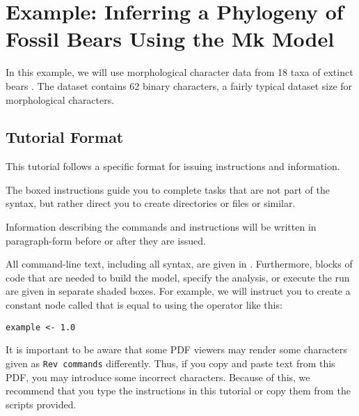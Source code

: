 \section{Example: Inferring a Phylogeny of Fossil Bears Using the Mk Model}\label{sec:dm_simple}

In this example, we will use morphological character data from 18 taxa of extinct bears \citep{abella2011}. 
The dataset contains 62 binary characters, a fairly typical dataset size for morphological characters. \par

\medskip
\subsection{Tutorial Format}\label{subsect:Exercise-Format}

This tutorial follows a specific format for issuing instructions and information.

{\begin{framed}
The boxed instructions guide you to complete tasks that are not part of the \RevBayes syntax, but rather direct you to create directories or files or similar.
\end{framed}}


Information describing the commands and instructions will be written in paragraph-form before or after they are issued.

All command-line text, including all \Rev syntax, are given in . 
Furthermore, blocks of \Rev code that are needed to build the model, specify the analysis, or execute the run are given in separate shaded boxes.
For example, we will instruct you to create a constant node called  that is equal to  using the \cl{<-} operator like this:
{\tt \begin{snugshade*}
\begin{lstlisting}
example <- 1.0
\end{lstlisting}
\end{snugshade*}
}

It is important to be aware that some PDF viewers may render some characters given as \colorbox{shadecolor}{\tt{Rev commands}} differently. 
Thus, if you copy and paste text from this PDF, you may introduce some incorrect characters. 
Because of this, we recommend that you type the instructions in this tutorial or copy them from the scripts provided. 


